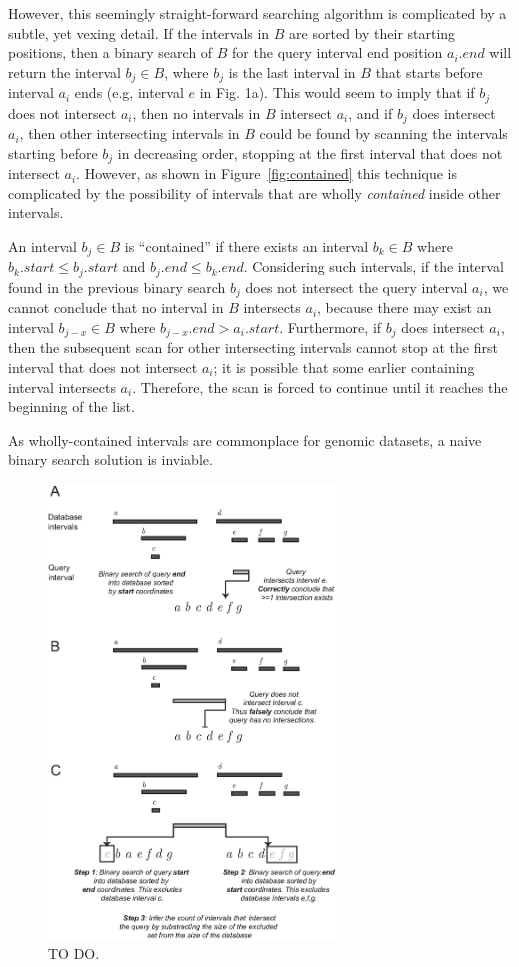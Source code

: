 \documentclass{bioinfo}
\begin{document}
	However, this seemingly straight-forward searching algorithm is complicated by a 
	subtle, yet vexing detail. If the intervals in $B$ are sorted by their starting positions, 
	then a binary search of $B$ for the query interval end position $a_i.end$ will return the
	interval $b_j \in B$, where $b_j$ is the last interval in $B$ that starts before
	interval $a_i$ ends (e.g, interval $e$ in Fig. 1a).  This would seem to imply that 
	if $b_j$ does not intersect $a_i$, then no intervals in $B$ intersect $a_i$, and if $b_j$ does intersect
	$a_i$, then other intersecting intervals in $B$ could be found by scanning the
	intervals starting before $b_j$ in decreasing order, stopping at the first
	interval that does not intersect $a_i$.  However, as shown in Figure~\ref{fig:contained} 
	this technique is complicated by the possibility of intervals that are wholly {\em contained} 
	inside other intervals. 
	
	An interval $b_j\in B$ is ``contained'' if there exists an interval
	$b_k \in B$ where $b_k.start \leq b_j.start$ and $b_j.end \leq
	b_k.end$.  Considering such intervals, if the interval found in the
	previous binary search $b_j$ does not intersect the query interval
	$a_i$, we cannot conclude that no interval in $B$ intersects $a_i$,
	because there may exist an interval $b_{j-x} \in B$ where $b_{j-x}.end
	> a_i.start$.  Furthermore, if $b_j$ does intersect $a_i$, then the
	subsequent scan for other intersecting intervals cannot stop at the
	first interval that does not intersect $a_i$; it is possible that some
	earlier containing interval intersects $a_i$. Therefore, the scan is
	forced to continue until it reaches the beginning of the list.
	
	As wholly-contained intervals are commonplace for genomic datasets,
	a naive binary search solution is inviable.
	
	\begin{figure}[h]
		\centering
		\includegraphics[width=3in]{figures/Figure1.v2.eps}
		\caption{TO DO.}
		\label{bitssearching}
	\end{figure}
	
\end{document}
